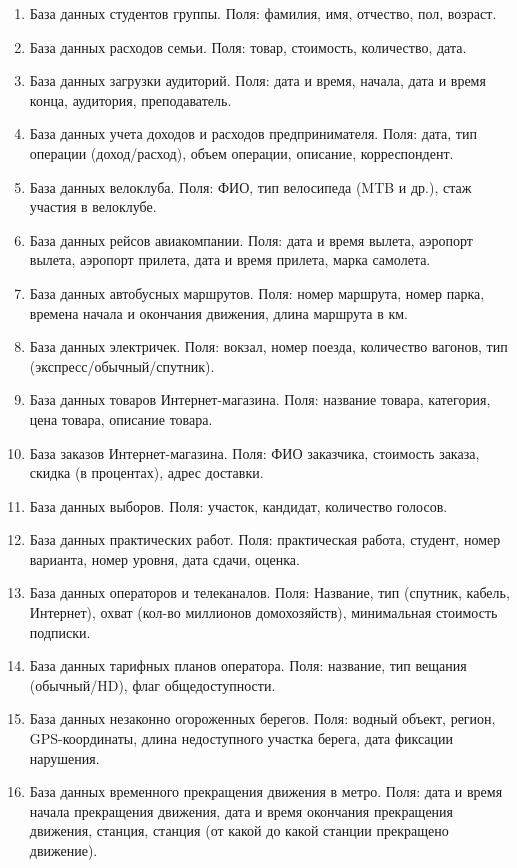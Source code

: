 \documentclass[12pt]{article}
\begin{document}
    \begin{enumerate}
	\item База данных студентов группы. Поля: фамилия, имя, отчество, пол, возраст. 
	\item База данных расходов семьи. Поля: товар, стоимость, количество, дата.
	\item База данных загрузки аудиторий. Поля: дата и время, начала, дата и время конца, аудитория, преподаватель. 
	\item База данных учета доходов и расходов предпринимателя. Поля: дата, тип операции (доход/расход), объем операции, описание, 
корреспондент. 
	\item База данных велоклуба. Поля: ФИО, тип велосипеда (MTB и др.), стаж участия в велоклубе.
	\item База данных рейсов авиакомпании. Поля: дата и время вылета, аэропорт вылета, аэропорт прилета, дата и время прилета, 
марка самолета.
	\item База данных автобусных маршрутов. Поля: номер маршрута, номер парка, времена начала и окончания движения,
длина маршрута в км. 
	\item База данных электричек. Поля: вокзал, номер поезда, количество вагонов, тип (экспресс/обычный/спутник).
	\item База данных товаров Интернет-магазина. Поля: название товара, категория, цена товара, описание товара. 
	\item База заказов Интернет-магазина. Поля: ФИО заказчика, стоимость заказа, скидка (в процентах), адрес доставки. 
	\item База данных выборов. Поля: участок, кандидат, количество голосов.
	\item База данных практических работ. Поля: практическая работа, студент, номер варианта, номер уровня, 
дата сдачи, оценка. 
	\item База данных операторов и телеканалов. Поля: Название, тип (спутник, кабель, Интернет), охват (кол-во миллионов домохозяйств), минимальная
стоимость подписки. 
	\item База данных тарифных планов оператора. Поля: название, тип вещания (обычный/HD), флаг общедоступности. 
	\item База данных незаконно огороженных берегов. Поля: водный объект, регион, GPS-координаты, длина недоступного участка берега, дата фиксации нарушения.
	\item База данных временного прекращения движения в метро. Поля: дата и время начала прекращения
движения, дата и время окончания прекращения движения, станция, станция (от какой до какой станции прекращено движение).

\end{enumerate}
\end{document}
